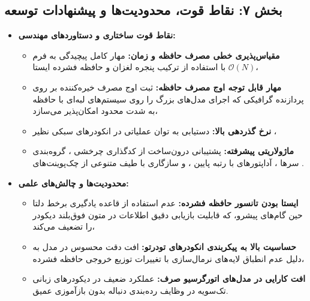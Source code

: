 \subsection*{بخش ۷: نقاط قوت، محدودیت‌ها و پیشنهادات توسعه }

\begin{itemize}
    \item \textbf{نقاط قوت ساختاری و دستاوردهای مهندسی:}
    \begin{itemize}
        \item \textbf{مقیاس‌پذیری خطی مصرف حافظه و زمان:} مهار کامل پیچیدگی به فرم $\mathcal{O}(N)$ با استفاده از ترکیب پنجره لغزان و حافظه فشرده ایستا،
        \item \textbf{مهار قابل توجه اوج مصرف حافظه:} ثبت اوج مصرف خیره‌کننده  بر روی پردازنده گرافیکی  که اجرای مدل‌های بزرگ را روی سیستم‌های لبه‌ای با حافظه به شدت محدود امکان‌پذیر می‌سازد،
        \item \textbf{نرخ گذردهی بالا:} دستیابی به توان عملیاتی  در انکودرهای سبکی نظیر ،
        \item \textbf{ماژولاریتی پیشرفته:} پشتیبانی درون‌ساخت از کدگذاری چرخشی ، گروه‌بندی سرها ، آداپتورهای با رتبه پایین ، و سازگاری با طیف متنوعی از چک‌پوینت‌های .
    \end{itemize}

    \item \textbf{محدودیت‌ها و چالش‌های علمی:}
    \begin{itemize}
        \item \textbf{ایستا بودن تانسور حافظه فشرده:} عدم استفاده از قاعده یادگیری برخط دلتا  حین گام‌های پیشرو، که قابلیت بازیابی دقیق اطلاعات در متون فوق‌بلند دیکودر را تضعیف می‌کند،
        \item \textbf{حساسیت بالا به پیکربندی انکودرهای تودرتو:} افت دقت محسوس در مدل  به دلیل عدم انطباق لایه‌های نرمال‌سازی با تغییرات توزیع خروجی حافظه فشرده،
        \item \textbf{افت کارایی در مدل‌های اتورگرسیو صرف:} عملکرد ضعیف در دیکودرهای زبانی تک‌سویه  در وظایف رده‌بندی دنباله بدون بازآموزی عمیق.
    \end{itemize}


\end{itemize}
